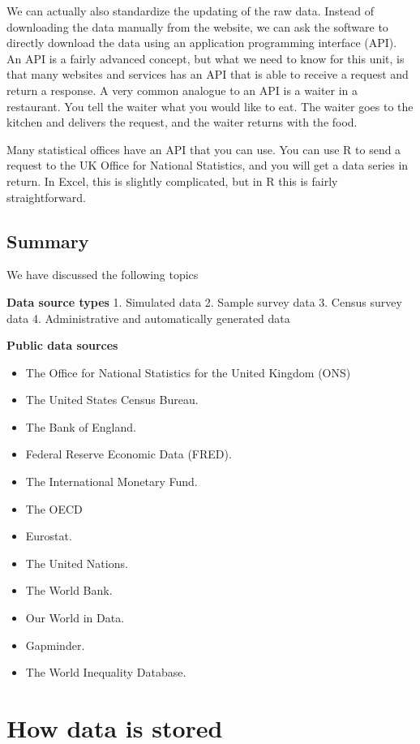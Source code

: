 \documentclass[]{book}
\providecommand{\tightlist}{%
  \setlength{\itemsep}{0pt}\setlength{\parskip}{0pt}}
\begin{document}
We can actually also standardize the updating of the raw data. Instead of downloading the data manually from the website, we can ask the software to directly download the data using an application programming interface (API). An API is a fairly advanced concept, but what we need to know for this unit, is that many websites and services has an API that is able to receive a request and return a response. A very common analogue to an API is a waiter in a restaurant. You tell the waiter what you would like to eat. The waiter goes to the kitchen and delivers the request, and the waiter returns with the food.

Many statistical offices have an API that you can use. You can use R to send a request to the UK Office for National Statistics, and you will get a data series in return. In Excel, this is slightly complicated, but in R this is fairly straightforward.

\hypertarget{summary-8}{%
\section{Summary}\label{summary-8}}

We have discussed the following topics

\textbf{Data source types}
1. Simulated data
2. Sample survey data
3. Census survey data
4. Administrative and automatically generated data

\textbf{Public data sources}

\begin{itemize}
\tightlist
\item
  The Office for National Statistics for the United Kingdom (ONS)
\item
  The United States Census Bureau.
\item
  The Bank of England.
\item
  Federal Reserve Economic Data (FRED).
\item
  The International Monetary Fund.
\item
  The OECD
\item
  Eurostat.
\item
  The United Nations.
\item
  The World Bank.
\item
  Our World in Data.
\item
  Gapminder.
\item
  The World Inequality Database.
\end{itemize}

\hypertarget{how-data-is-stored}{%
\chapter{How data is stored}\label{how-data-is-stored}}
\end{document}
